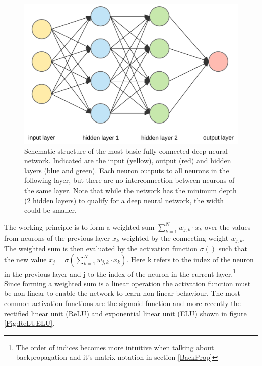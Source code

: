 			\begin{figure}
				\includegraphics[width=\textwidth]{images/simpleNN.png}
				\caption{Schematic structure of the most basic fully connected deep neural network. Indicated are the input (yellow), output (red) and hidden layers (blue and green). Each neuron outputs to all neurons in the following layer, but there are no interconnection between neurons of the same layer. Note that while the network has the minimum depth (2 hidden layers) to qualify for a deep neural network, the width  could be smaller.}
				\label{Img_NNFully}
			\end{figure}

			The working principle is to form a weighted sum $\sum_{k=1}^{N} w_{j,k} \cdot x_{k}$ over the values from neurons of the previous layer $x_{k}$ weighted by the connecting weight $w_{j,k}$. The weighted sum is then evaluated by the activation function $\sigma()$ such that the new value $x_j = \sigma(\sum_{k=1}^{N} w_{j,k} \cdot x_{k})$. Here k refers to the index of the neuron in the previous layer and j to the index of the neuron in the current layer.\footnote{The order of indices becomes more intuitive when talking about backpropagation and it's matrix notation in section \ref{BackProp}}\\
			Since forming a weighted sum is a linear operation the activation function must be non-linear to enable the network to learn non-linear behaviour. The most common activation functions are the sigmoid function and more recently the rectified linear unit (ReLU) and exponential linear unit (ELU) shown in figure \ref{Fig:ReLUELU}.\\
		
